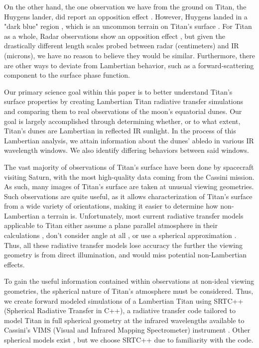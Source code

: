 \documentclass[twocolumn,linenumbers]{aastex631}
\begin{document}
On the other hand, the one observation we have from the ground on Titan, the Huygens lander, did report an opposition effect \citep{Schroder2009, Karkoschka2012}. However, Huygens landed in a "dark blue" region \citep{Rodriguez2006}, which is an uncommon terrain on Titan's surface \citep{Keller2008}. For Titan as a whole, Radar observations show an opposition effect \citep{Neish2010, Wye2011}, but given the drastically different length scales probed between radar (centimeters) and IR (microns), we have no reason to believe they would be similar. Furthermore, there are other ways to deviate from Lambertian behavior, such as a forward-scattering component to the surface phase function.

Our primary science goal within this paper is to better understand Titan's surface properties by creating Lambertian Titan radiative transfer simulations and comparing them to real observations of the moon's equatorial dunes. Our goal is largely accomplished through determining whether, or to what extent, Titan's dunes are Lambertian in reflected IR sunlight. In the process of this Lambertian analysis, we attain information about the dunes' abledo in various IR wavelength windows. We also identify differing behaviors between said windows.

The vast majority of observations of Titan's surface have been done by spacecraft visiting Saturn, with the most high-quality data coming from the Cassini mission. As such, many images of Titan's surface are taken at unusual viewing geometries. Such observations are quite useful, as it allows characterization of Titan's surface from a wide variety of orientations, making it easier to determine how non-Lambertian a terrain is. Unfortunately, most current radiative transfer models applicable to Titan either assume a plane parallel atmosphere in their calculations \citep{Griffith2012, Rodriguez2018, EsSayeh2023}, don't consider angle at all \citep{Vinatier2007, Rannou2021}, or use a spherical approximation \citep{Corlies2021}. Thus, all these radiative transfer models lose accuracy the further the viewing geometry is from direct illumination, and would miss potential non-Lambertian effects.

To gain the useful information contained within observations at non-ideal viewing geometries, the spherical nature of Titan's atmosphere must be considered. Thus, we create forward modeled simulations of a Lambertian Titan using SRTC++ (Spherical Radiative Transfer in C++), a radiative transfer code tailored to model Titan in full spherical geometry at the infrared wavelengths available to Cassini's VIMS (Visual and Infrared Mapping Spectrometer) instrument \citep{Barnes2018a}. Other spherical models exist \citep{Xu2013}, but we choose SRTC++ due to familiarity with the code.
\end{document}
